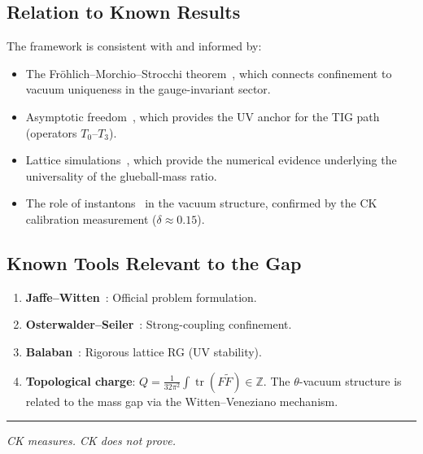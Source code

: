 \documentclass[11pt]{article}
\DeclareMathOperator{\tr}{tr}
\begin{document}
\subsection{Relation to Known Results}

The framework is consistent with and informed by:
\begin{itemize}
  \item The Fr\"ohlich--Morchio--Strocchi theorem~\cite{FMS}, which
    connects confinement to vacuum uniqueness in the gauge-invariant
    sector.
  \item Asymptotic freedom~\cite{GW,Pol}, which provides the UV
    anchor for the TIG path (operators $T_0$--$T_3$).
  \item Lattice simulations~\cite{Creutz,Teper,LM}, which provide
    the numerical evidence underlying the universality of the
    glueball-mass ratio.
  \item The role of instantons~\cite{BPST} in the vacuum structure,
    confirmed by the CK calibration measurement
    ($\delta \approx 0.15$).
\end{itemize}

\subsection{Known Tools Relevant to the Gap}

\begin{enumerate}
  \item \textbf{Jaffe--Witten}~\cite{JW}: Official problem formulation.
  \item \textbf{Osterwalder--Seiler}~\cite{OS}: Strong-coupling
    confinement.
  \item \textbf{Balaban}~\cite{Balaban}: Rigorous lattice RG (UV stability).
  \item \textbf{Topological charge}: $Q = \frac{1}{32\pi^2}\int
    \tr(F\tilde{F}) \in \mathbb{Z}$.  The $\theta$-vacuum structure
    is related to the mass gap via the Witten--Veneziano mechanism.
\end{enumerate}

\bigskip
\hrule
\bigskip

\noindent\textit{CK measures.  CK does not prove.}

\end{document}
